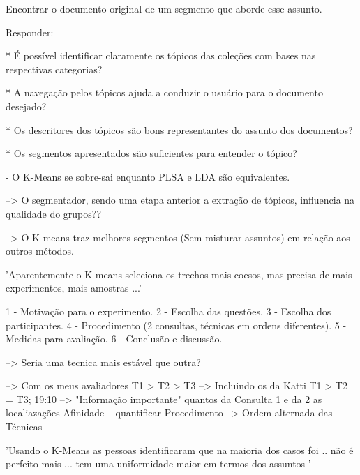 Encontrar o documento original de um segmento que aborde esse assunto.

Responder:


* É possível identificar claramente os tópicos das coleções com bases nas respectivas categorias?


* A navegação pelos tópicos ajuda a conduzir o usuário para o documento desejado?


* Os descritores dos tópicos são bons representantes do assunto dos documentos?


* Os segmentos apresentados são suficientes para entender o tópico?








 - O K-Means se sobre-sai enquanto PLSA e LDA são equivalentes.


--> O segmentador, sendo uma etapa anterior a extração de tópicos, influencia na qualidade do grupos??

--> O K-means traz melhores segmentos (Sem misturar assuntos) em relação aos outros métodos.


'Aparentemente o K-means seleciona os trechos mais coesos, mas precisa de mais experimentos, mais amostras ...'




 1 - Motivação para o experimento.
 2 - Escolha das questões.
 3 - Escolha dos participantes.
 4 - Procedimento (2 consultas, técnicas em ordens diferentes).
 5 - Medidas para avaliação.
 6 - Conclusão e discussão.



--> Seria uma tecnica mais estável que  outra? 


--> Com os meus avaliadores T1 > T2 > T3
--> Incluindo os da Katti   T1 > T2 = T3;
19:10 --> "Informação importante"
quantos da Consulta 1 e da 2
as localiazações
Afinidade -- quantificar
Procedimento --> Ordem alternada das Técnicas






'Usando o K-Means as pessoas identificaram que na maioria dos casos foi .. não é perfeito mais ... tem uma uniformidade maior em termos dos assuntos '









